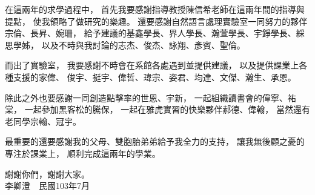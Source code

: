 \begin{acknowledgementszh}

在這兩年的求學過程中，
首先我要感謝指導教授陳信希老師在這兩年間的指導與提點，
使我領略了做研究的樂趣。
還要感謝自然語言處理實驗室一同努力的夥伴宗倫、長昇、婉珊，
給予建議的基鑫學長、界人學長、瀚萱學長、宇錚學長、綵思學姊，
以及不時與我討論的志杰、俊杰、詠翔、彥賓、聖倫。

而出了實驗室，
我要感謝不時會在系館各處遇到並提供建議，
以及提供課業上各種支援的家偉、
俊宇、挺宇、偉哲、瑋宗、姿君、均達、文傑、瀚生、承恩。

除此之外也要感謝一同創造點擊率的世恩、宇新，
一起組織讀書會的偉寧、祐棠，
一起參加黑客松的騰保，
一起在雅虎實習的快樂夥伴郝德、偉翰，
當然還有老同學宗翰、冠宇。

最重要的還要感謝我的父母、雙胞胎弟弟給予我全力的支持，
讓我無後顧之憂的專注於課業上，
順利完成這兩年的學業。

謝謝你們，謝謝大家。\\

\hfill 李卿澄\ \ 民國103年7月

\end{acknowledgementszh}


